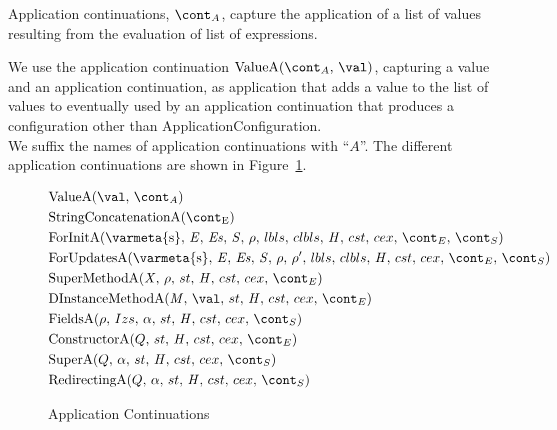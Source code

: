 \documentclass{article}
\begin{document}
Application continuations, $\acont$, capture the application of a list of values resulting from the evaluation of list of expressions.

\newcommand{\ValueA}[2]{\mathrm{ValueA}({#1},\,{#2})}
\newcommand{\StringConcatenationA}{\mathrm{StringConcatenationA(\econt)}}
\newcommand{\SuperMethodA}{\mathrm{SuperMethodA}(\idmeta,\,\env,\,\ExceptionHandlers,\,\econt)}
\newcommand{\StaticInvA}[4]{\mathrm{StaticInvocationA}({#1},\,{#2},\,{#3},\,\ExceptionHandlersRest,\,{#4})}
\newcommand{\DInstanceMethodA}{\mathrm{DInstanceMethodA}(\membermeta,\,\val,\,\ExceptionHandlers,\,\econt)}
\newcommand{\FieldsA}[4]{\mathrm{FieldsA}({#1},\,{#2},\,{#3},\,\strace,\,\handler,\,\cstrace,\,\cex,\,{#4})}
\newcommand{\SuperA}[3]{\mathrm{SuperA}({#1},\,{#2},\,\strace,\,\handler,\,\cstrace,\,\cex,\,{#3})}
\newcommand{\ConstructorA}[2]{\mathrm{ConstructorA}({#1},\,\strace,\,\handler,\,\cstrace,\,\cex,\,{#2})}
\newcommand{\RedirectingA}[3]{\mathrm{RedirectingA}({#1},\,{#2},\,\strace,\,\handler,\,\cstrace,\,\cex,\,{#3})}
\newcommand{\ForInitA}{\mathrm{ForInitA}(\mathrm{\varmeta{s}},\, \expressionmeta,\, \exprs,\, \statementmeta,\, \env,\, \lbls,\, \clbls,\, \handler,\, \cstrace,\, \cex,\, \econt,\, \scont)}
%
\newcommand{\ForUpdatesA}[1]{\mathrm{ForUpdatesA}(\mathrm{\varmeta{s}},\, \expressionmeta,\, \exprs,\, \statementmeta,\, \env,\, #1,\, \lbls,\, \clbls,\, \handler,\, \cstrace,\, \cex,\, \econt,\, \scont)}
\noindent
We use the application continuation $\ValueA{\acont}{\val}$, capturing a value and an application continuation, as application that adds a value to the list of values to eventually used by an application continuation that produces a configuration other than ApplicationConfiguration.\\
\noindent
We suffix the names of application continuations with ``$A$''.
The different application continuations are shown in Figure~\ref{figure:acont}.
\begin{figure}[Htp]
  \begin{align}
	&\ValueA{\val}{\acont} \label{acont:value}\\
	&\StringConcatenationA \label{acont:stringconcat}\\
	&\ForInitA \label{acont:forinit}\\
	&\ForUpdatesA{\env'} \label{acont:forupdates}\\
	&\SuperMethodA \label{acont:supermethod}\\
	&\DInstanceMethodA \label{acont:staticinv}\\
	&\FieldsA{\env}{Izs}{\loc}{\scont} \label{acont:fields}\\
	&\ConstructorA{Q}{\econt} \label{acont:constructor}\\
	&\SuperA{Q}{\loc}{\scont} \label{acont:super}\\
	&\RedirectingA{Q}{\loc}{\scont} \label{acont:redirecting}
  \end{align}
  \caption{Application Continuations}
  \label{figure:acont}
\end{figure}
\end{document}

